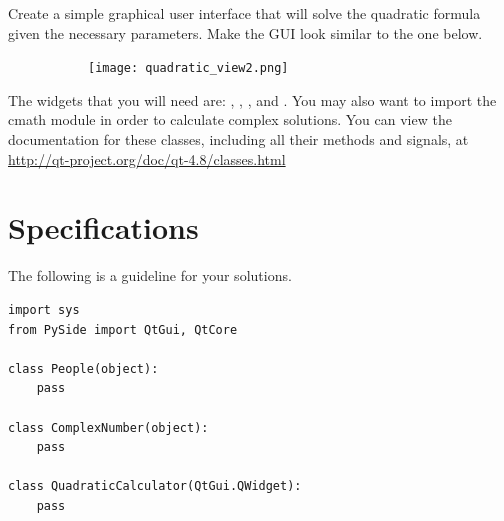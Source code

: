 \begin{problem}
Create a simple graphical user interface that will solve the quadratic formula given the necessary parameters.
Make the GUI look similar to the one below.
\begin{figure}[H]
\centering

\begin{subfigure}[b]{.49\textwidth}
\texttt{[image: quadratic\_view2.png]}
\end{subfigure}
\end{figure}
The widgets that you will need are: , , , and . You may also want to import the cmath module in order to calculate complex solutions.
You can view the documentation for these classes, including all their methods and signals, at \url{http://qt-project.org/doc/qt-4.8/classes.html}
\label{prob:quadCalc}
\end{problem}


\section*{Specifications}

The following is a guideline for your solutions.

\begin{lstlisting}
import sys
from PySide import QtGui, QtCore

class People(object):
	pass
	
class ComplexNumber(object):
	pass
	
class QuadraticCalculator(QtGui.QWidget):
	pass
\end{lstlisting}